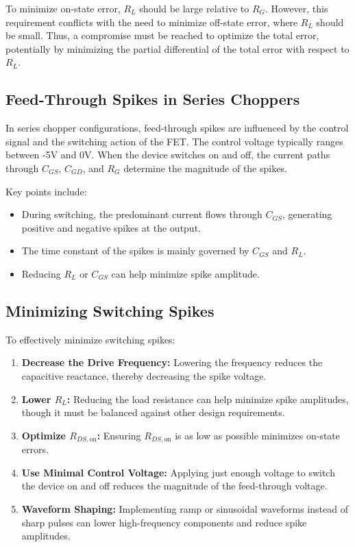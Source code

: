 \documentclass[a4paper,9pt,twoside,openany,twocolumn]{memoir}
\begin{document}
To minimize on-state error, \( R_L \) should be large relative to \( R_G \). However, this requirement conflicts with the need to minimize off-state error, where \( R_L \) should be small. Thus, a compromise must be reached to optimize the total error, potentially by minimizing the partial differential of the total error with respect to \( R_L \).

\subsection{Feed-Through Spikes in Series Choppers}

In series chopper configurations, feed-through spikes are influenced by the control signal and the switching action of the FET. The control voltage typically ranges between -5V and 0V. When the device switches on and off, the current paths through \( C_{GS} \), \( C_{GD} \), and \( R_G \) determine the magnitude of the spikes.

Key points include:

\begin{itemize}
    \item During switching, the predominant current flows through \( C_{GS} \), generating positive and negative spikes at the output.
    
    \item The time constant of the spikes is mainly governed by \( C_{GS} \) and \( R_L \).
    
    \item Reducing \( R_L \) or \( C_{GS} \) can help minimize spike amplitude.
\end{itemize}

\subsection{Minimizing Switching Spikes}

To effectively minimize switching spikes:

\begin{enumerate}
    \item \textbf{Decrease the Drive Frequency:} Lowering the frequency reduces the capacitive reactance, thereby decreasing the spike voltage.
    
    \item \textbf{Lower \( R_L \):} Reducing the load resistance can help minimize spike amplitudes, though it must be balanced against other design requirements.
    
    \item \textbf{Optimize \( R_{DS,\text{on}} \):} Ensuring \( R_{DS,\text{on}} \) is as low as possible minimizes on-state errors.
    
    \item \textbf{Use Minimal Control Voltage:} Applying just enough voltage to switch the device on and off reduces the magnitude of the feed-through voltage.
    
    \item \textbf{Waveform Shaping:} Implementing ramp or sinusoidal waveforms instead of sharp pulses can lower high-frequency components and reduce spike amplitudes.
\end{enumerate}
\end{document}
